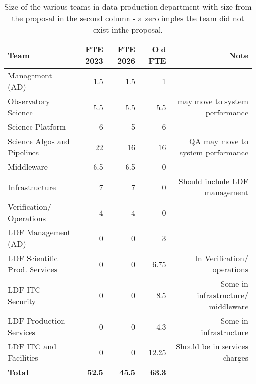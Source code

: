  \begin{longtable} { |p{}  |r  |r  |r  |r |} 
\caption{Size of the various teams in data production department with size from the proposal in the second column - a zero imples the team did not exist inthe proposal. \label{tab:FTE}}\\ 
\hline 
\textbf{Team}&\textbf{FTE 2023}&\textbf{FTE 2026}&\textbf{Old \gls{FTE} }&\textbf{Note} \\ \hline
{Management (\gls{AD})}&{1.5}&{1.5}&{1}& \\ \hline
{Observatory Science }&{5.5}&{5.5}&{5.5}&{may move to system performance} \\ \hline
{Science Platform}&{6}&{5}&{6}& \\ \hline
{Science Algos and Pipelines}&{22}&{16}&{16}&{QA may move to system performance} \\ \hline
{Middleware}&{6.5}&{6.5}&{0}& \\ \hline
{Infrastructure}&{7}&{7}&{0}&{Should include \gls{LDF} management} \\ \hline
{Verification/ Operations}&{4}&{4}&{0}& \\ \hline
{LDF Management (\gls{AD}) }&{0}&{0}&{3}& \\ \hline
{LDF Scientific Prod. Services}&{0}&{0}&{6.75}&{In Verification/ operations} \\ \hline
{LDF \gls{ITC} Security}&{0}&{0}&{8.5}&{Some in infrastructure/ middleware } \\ \hline
{LDF Production Services}&{0}&{0}&{4.3}&{Some in infrastructure} \\ \hline
{LDF \gls{ITC} and Facilities}&{0}&{0}&{12.25}&{Should be in services charges} \\ \hline
\textbf{Total}&\textbf{52.5}&\textbf{45.5}&\textbf{63.3}& \\ \hline
\end{longtable}
